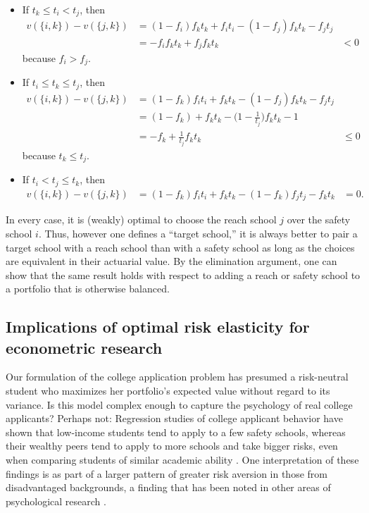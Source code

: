 \begin{itemize}
\item If $t_k \leq t_i < t_j$, then 
\begin{align*}
v(\{i, k\}) -  v(\{j, k\}) &= (1 - f_i) f_k t_k  + f_i t_i - (1 - f_j) f_k t_k - f_j t_j \\
&=  - f_i f_k t_k + f_j f_k t_k &< 0
\end{align*}
because $f_i > f_j$. 
\item If  $t_i \leq t_k \leq t_j$, then 
\begin{align*}
v(\{i, k\}) -  v(\{j, k\}) &= (1 - f_k ) f_i t_i + f_k t_k - (1 - f_j) f_k t_k - f_j t_j \\
&= (1 - f_k) + f_k t_k - \bigl( 1 - \frac{1}{t_j}\bigr) f_k t_k - 1  \\
&=  - f_k + \frac{1}{t_j} f_k t_k & \leq 0
\end{align*}
because $t_k \leq t_j$.
\item If $t_i < t_j \leq t_k$, then 
\begin{align*}
v(\{i, k\}) -  v(\{j, k\}) &=  (1 - f_k) f_i t_i + f_k t_k - (1 - f_k) f_j t_j - f_k t_k &= 0.
\end{align*}
\end{itemize}

\noindent In every case, it is (weakly) optimal to choose the reach school $j$ over the safety school $i$. Thus, however one defines a ``target school,'' it is always better to pair a target school with a reach school than with a safety school as long as the choices are equivalent in their actuarial value. By the elimination argument, one can show that the same result holds with respect to adding a reach or safety school to a portfolio that is otherwise balanced.

\subsection{Implications of optimal risk elasticity for econometric research} \label{subsectionRiskAversionEconometrics}

Our formulation of the college application problem has presumed a risk-neutral student who maximizes her portfolio's expected value without regard to its variance. Is this model complex enough to capture the psychology of real college applicants? Perhaps not: Regression studies of college applicant behavior have shown that low-income students tend to apply to a few safety schools, whereas their wealthy peers tend to apply to more schools and take bigger risks, even when comparing students of similar academic ability \citep{hoxbyandavery2012}. One interpretation of these findings is as part of a larger pattern of greater risk aversion in those from disadvantaged backgrounds, a finding that has been noted in other areas of psychological research \citep{hartlaubandschneider2012,wattsetal2018,vanhuizenandalessie2019}.

